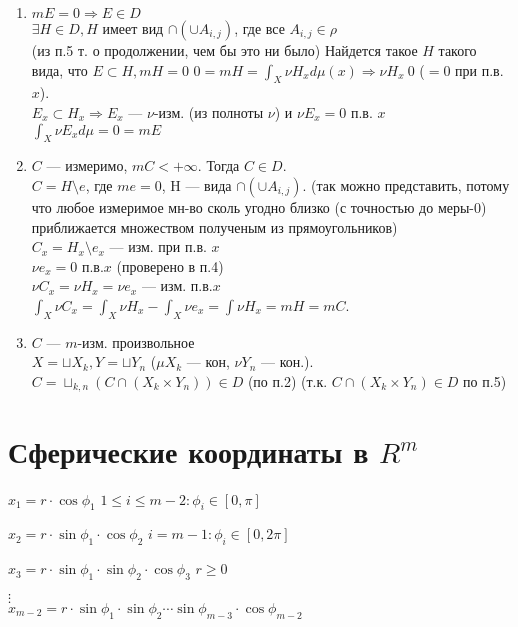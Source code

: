 \documentclass[paper=a4, fontsize=14pt]{report}
\begin{document}
\begin{enumerate}
			\item
				$m E = 0 \Rightarrow E \in D$\\
				$\exists H \in D, H$ имеет вид $\cap(\cup A_{i, j})$, где все $A_{i,j} \in \rho$ \\
				(из п.5 т. о продолжении, чем бы это ни было) Найдется такое $H$ такого вида, что $E \subset H , m H = 0$
				$0 = m H = \int_X\nu H_x d\mu(x) \Rightarrow \nu H_x ~ 0$ ($ = 0$ при п.в. $x$).\\
				$E_x \subset H_x \Rightarrow E_x$ --- $\nu$-изм. (из полноты $\nu$) и $\nu E_x = 0$ п.в. $x$\\
				$\int_X \nu E_x d\mu = 0 = m E$
			\item
				$C$ --- измеримо, $m C < +\infty$. Тогда $C \in D$.\\
				$C = H \setminus e$, где $m e = 0$, H --- вида $\cap(\cup A_{i, j})$. (так можно представить, потому что любое измеримое мн-во сколь угодно близко (с точностью до меры-0) приближается множеством полученым из прямоугольников) \\
				$C_x = H_x \setminus e_x$ --- изм. при п.в. $x$\\
				$\nu e_x = 0$ п.в.$x$ (проверено в п.4)\\
				$\nu C_x = \nu H_x = \nu e_x$ --- изм. п.в.$x$\\
				$\int_X\nu C_x = \int_X\nu H_x - \int_X\nu e_x = \int\nu H_x = m H = m C$.
			\item
				$C$ --- $m$-изм. произвольное\\
				$X = \sqcup X_k, Y = \sqcup Y_n$ ($\mu X_k$ --- кон, $\nu Y_n$ --- кон.).\\
				$C = \sqcup_{k,n}(C \cap(X_k \times Y_n)) \in D$ (по п.2) (т.к. $C \cap(X_k \times Y_n) \in D$ по п.5)
\end{enumerate}

\section{Сферические координаты в $ R^m $}

$x_1 = r \cdot \cos \phi_1$
\hfill
$1 \leq i \leq m-2: \phi_i \in [0,\pi]$

$x_2 = r \cdot \sin \phi_1 \cdot \cos \phi_2$
\hfill
$i=m-1: \phi_i \in [0,2\pi]$

$x_3 = r \cdot \sin \phi_1 \cdot \sin \phi_2 \cdot \cos \phi_3$
\hfill
$r \geq 0$

$\vdots$\\
$x_{m-2} = r \cdot \sin \phi_1 \cdot \sin \phi_2 \cdots \sin \phi_{m-3} \cdot \cos \phi_{m-2}$
\end{document}
